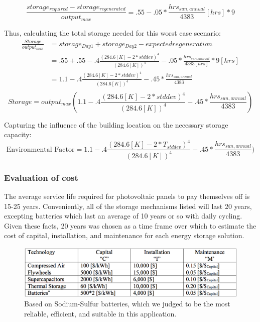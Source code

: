 \begin{equation}
\frac{storage_{required}-storage_{regenerated}}{output_{max}} =
.55-.05*\frac{hrs_{sun,annual}}{4383} [hrs]*9
\end{equation}

Thus, calculating the total storage needed for this worst case scenario:
\begin{equation}
\begin{aligned}
\frac{Storage}{output_{max}}&=storage_{Day1}+storage_{Day2}-expected
regeneration
\\
&=.55+.55-.4\frac{(284.6[K]-2*stddev)^4}{(284.6[K])^4}-.05*\frac{hrs_{sun,annual}}{4383
[hrs]}*9 [hrs] \\
&=1.1-.4\frac{(284.6[K]-2*stddev)^4}{(284.6
[K])^4}-.45*\frac{hrs_{sun,annual}}{4383}  \\
\end{aligned}
\end{equation}
\begin{equation}
Storage=output_{max}(1.1-.4\frac{(284.6[K]-2*stddev)^4}{(284.6
[K])^4}-.45*\frac{hrs_{sun,annual}}{4383})
\end{equation}

Capturing the influence of the building location on the necessary storage capacity:
\begin{equation}
\text{Environmental Factor}=1.1-.4\frac{(284.6[K]-2*T_{stddev})^4}{(284.6
[K])^4}-.45*\frac{hrs_{sun,annual}}{4383})
\end{equation}

\subsubsection{Evaluation of cost}

The average service life required for photovoltaic panels to pay themselves off
is 15-25 years. Conveniently, all of the storage mechanisms listed will last 20
years, excepting batteries which last an average of 10 years or so with daily
cycling. Given these facts, 20 years was chosen as a time frame over which to
estimate the cost of capital, installation, and maintenance for each energy
storage solution.

\begin{figure}
\begin{center}
\includegraphics[scale=0.3]{pics/PatrickTable0.png}
\caption{Based on Sodium-Sulfur batteries, which we judged to be the most
reliable, efficient, and suitable in this application.}
\label{patrickTable0}
\end{center}
\end{figure}

